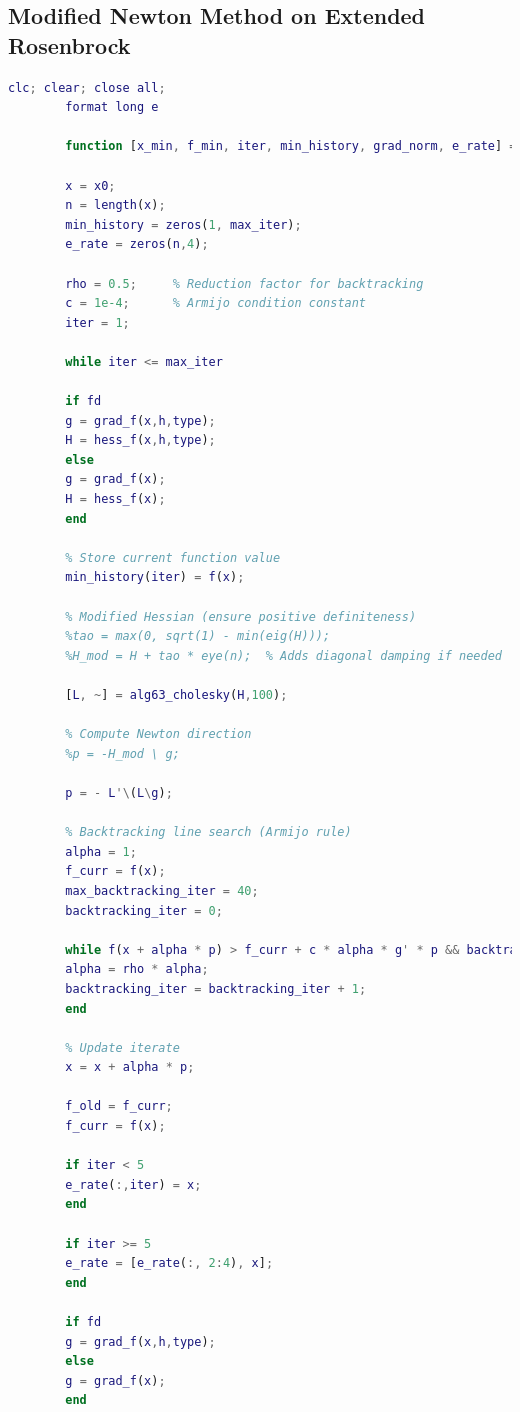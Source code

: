 \documentclass[a4paper,12pt]{article}
\begin{document}
	\subsection*{Modified Newton Method on Extended Rosenbrock}
	\begin{lstlisting}[language=Matlab,caption={Full script: Modified Newton method on Extended Rosenbrock},label={lst:rosenbrock-extended}]
		clc; clear; close all;
		format long e
		
		function [x_min, f_min, iter, min_history, grad_norm, e_rate] = modified_newton(f,grad_f,hess_f,x0,tol,max_iter,fd,h,type)
		
		x = x0;
		n = length(x);
		min_history = zeros(1, max_iter);
		e_rate = zeros(n,4);
		
		rho = 0.5;     % Reduction factor for backtracking
		c = 1e-4;      % Armijo condition constant
		iter = 1;
		
		while iter <= max_iter
		
		if fd 
		g = grad_f(x,h,type);
		H = hess_f(x,h,type);
		else  
		g = grad_f(x);
		H = hess_f(x);
		end
		
		% Store current function value
		min_history(iter) = f(x); 
		
		% Modified Hessian (ensure positive definiteness)
		%tao = max(0, sqrt(1) - min(eig(H)));
		%H_mod = H + tao * eye(n);  % Adds diagonal damping if needed
		
		[L, ~] = alg63_cholesky(H,100); 
		
		% Compute Newton direction
		%p = -H_mod \ g;
		
		p = - L'\(L\g);
		
		% Backtracking line search (Armijo rule)
		alpha = 1;
		f_curr = f(x);
		max_backtracking_iter = 40; 
		backtracking_iter = 0;
		
		while f(x + alpha * p) > f_curr + c * alpha * g' * p && backtracking_iter < max_backtracking_iter
		alpha = rho * alpha;
		backtracking_iter = backtracking_iter + 1;
		end
		
		% Update iterate
		x = x + alpha * p;
		
		f_old = f_curr;
		f_curr = f(x);  
		
		if iter < 5
		e_rate(:,iter) = x;
		end
		
		if iter >= 5
		e_rate = [e_rate(:, 2:4), x];
		end
		
		if fd 
		g = grad_f(x,h,type);
		else  
		g = grad_f(x);
		end
		

\end{lstlisting}
\end{document}

